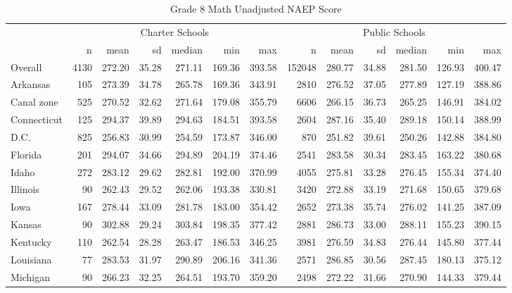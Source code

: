 \begin{sidewaystable}[ht]
\centering
\caption{Grade 8 Math Unadjusted NAEP Score} 
\label{tab:g8math-unadjscore}
\begin{tabular}{lrrrrrr@{\extracolsep{10pt}}rrrrrr}
  \hline & \multicolumn{6}{c}{Charter Schools} & \multicolumn{6}{c}{Public Schools} \\ \cline{2-7} \cline{8-13} & n & mean & sd & median & min & max & n & mean & sd & median & min & max \\ 
  \hline
Overall & 4130 & 272.20 & 35.28 & 271.11 & 169.36 & 393.58 & 152048 & 280.77 & 34.88 & 281.50 & 126.93 & 400.47 \\ 
  Arkansas & 105 & 273.39 & 34.78 & 265.78 & 169.36 & 343.91 & 2810 & 276.52 & 37.05 & 277.89 & 127.19 & 388.86 \\ 
  Canal zone & 525 & 270.52 & 32.62 & 271.64 & 179.08 & 355.79 & 6606 & 266.15 & 36.73 & 265.25 & 146.91 & 384.02 \\ 
  Connecticut & 125 & 294.37 & 39.89 & 294.63 & 184.51 & 393.58 & 2604 & 287.16 & 35.40 & 289.18 & 150.14 & 388.99 \\ 
  D.C. & 825 & 256.83 & 30.99 & 254.59 & 173.87 & 346.00 & 870 & 251.82 & 39.61 & 250.26 & 142.88 & 384.80 \\ 
  Florida & 201 & 294.07 & 34.66 & 294.89 & 204.19 & 374.46 & 2541 & 283.58 & 30.34 & 283.45 & 163.22 & 380.68 \\ 
  Idaho & 272 & 283.12 & 29.62 & 282.81 & 192.00 & 370.99 & 4055 & 275.81 & 33.28 & 276.45 & 155.34 & 374.40 \\ 
  Illinois &  90 & 262.43 & 29.52 & 262.06 & 193.38 & 330.81 & 3420 & 272.88 & 33.19 & 271.68 & 150.65 & 379.68 \\ 
  Iowa & 167 & 278.44 & 33.09 & 281.78 & 183.00 & 354.42 & 2652 & 273.38 & 35.74 & 276.02 & 141.25 & 387.09 \\ 
  Kansas &  90 & 302.88 & 29.24 & 303.84 & 198.35 & 377.42 & 2881 & 286.73 & 33.00 & 288.11 & 155.23 & 390.15 \\ 
  Kentucky & 110 & 262.54 & 28.28 & 263.47 & 186.53 & 346.25 & 3981 & 276.59 & 34.83 & 276.44 & 145.80 & 377.44 \\ 
  Louisiana &  77 & 283.53 & 31.97 & 290.89 & 206.16 & 341.36 & 2571 & 286.85 & 30.56 & 287.45 & 180.13 & 375.12 \\ 
  Michigan &  90 & 266.23 & 32.25 & 264.51 & 193.70 & 359.20 & 2498 & 272.22 & 31.66 & 270.90 & 144.33 & 379.44 \\ 

\end{tabular}
\end{sidewaystable}
